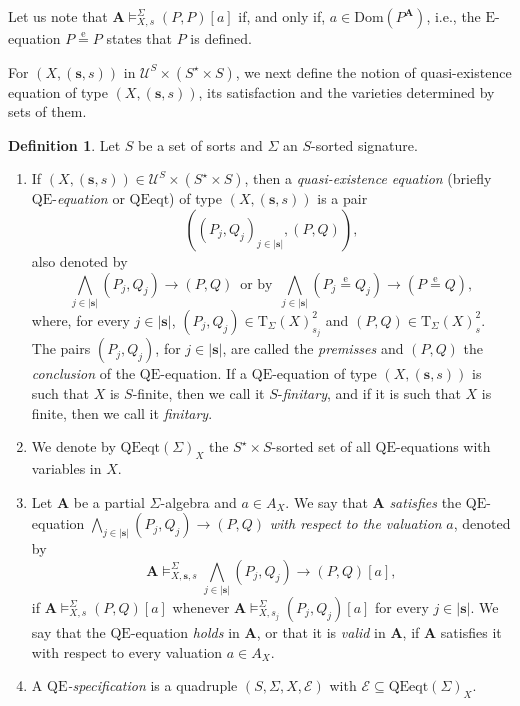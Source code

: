 \documentclass[a4paper, reqno]{amsbook}
\newcommand{\bb}[1]{\ensuremath{\lvert #1 \rvert}}
\newcommand{\eeq}{\overset{\mathrm e}{=}}      %
\newcommand{\QE}{\mathrm{QE}}
\newcommand{\Dom}{\mathrm{Dom}}
\theoremstyle{plain}
\theoremstyle{definition}
\newtheorem{definition}[theorem]{Definition}
\begin{document}
Let us note that $\mathbf{A}\models^{\Sigma}_{X,s}(P,P)[a]$ if, and only if, $a\in\Dom(P^{\mathbf{A}})$, i.e., the $\mathrm{E}$-equation $P\eeq P$ states that $P$ is defined.

For $(X,(\mathbf{s},s))$ in $\boldsymbol{\mathcal{U}}^{S}\times (S^{\star}\times S)$, we next define the notion of quasi-existence equation of type $(X,(\mathbf{s},s))$, its satisfaction and the varieties determined by sets of them.

\begin{definition}\label{DQEEq}
Let $S$ be a set of sorts and $\Sigma$ an $S$-sorted signature.
\begin{enumerate}
\item If $(X,(\mathbf{s},s))\in\boldsymbol{\mathcal{U}}^{S}\times (S^{\star}\times S)$, then a \emph{quasi-existence equation} (briefly $\QE$-\emph{equation} or $\mathrm{QEeqt}$) of type $(X,(\mathbf{s},s))$ is a pair
$$
\left(\left(
P_{j},Q_{j}
\right)_{j\in \bb{\mathbf{s}}},(P,Q)\right),
$$
also denoted by
$$
\textstyle
\bigwedge_{j\in\bb{\mathbf{s}}}(P_{j},Q_{j})\to (P,Q)\, \text{ or by }\,
\bigwedge_{j\in\bb{\mathbf{s}}}(P_{j}\eeq Q_{j})\to (P\eeq Q),
$$
where, for every $j\in \bb{\mathbf{s}}$, $(P_{j},Q_{j})\in\mathrm{T}_{\Sigma}(X)^{2}_{s_{j}}$ and $(P,Q)\in \mathrm{T}_{\Sigma}(X)^{2}_{s}$.
The pairs $(P_{j},Q_{j})$, for $j\in \bb{\mathbf{s}}$, are called the \emph{premisses} and $(P,Q)$ the \emph{conclusion} of the $\QE$-equation.
If a $\QE$-equation of type $(X,(\mathbf{s}, s))$ is such that $X$ is $S$-finite, then we call it $S$-\emph{finitary}, and if it is such that $X$ is finite, then we call it \emph{finitary}.
\item We denote by $\mathrm{QEeqt}(\Sigma)_{X}$ the $S^{\star}\times S$-sorted set of all $\QE$-equations with variables in $X$.
\item Let $\mathbf{A}$ be a partial $\Sigma$-algebra and $a\in A_{X}$.
We say that $\mathbf{A}$ \emph{satisfies} the $\QE$-equation $\bigwedge_{j\in\bb{\mathbf{s}}}(P_{j},Q_{j})\to (P,Q)$ \emph{with respect to the valuation} $a$, denoted by
      $$
      \textstyle
      \mathbf{A}\models^{\Sigma}_{X,\mathbf{s},s}\bigwedge_{j\in\bb{\mathbf{s}}}(P_{j},Q_{j})\to (P,Q) [a],
      $$
      if $\mathbf{A}\models^{\Sigma}_{X,s} (P,Q)[a]$ whenever $\mathbf{A}\models^{\Sigma}_{X,s_{j}} (P_{j},Q_{j})[a]$ for every $j\in \bb{\mathbf{s}}$.
We say that the $\QE$-equation \emph{holds} in $\mathbf{A}$, or that it is \emph{valid} in $\mathbf{A}$, if $\mathbf{A}$ satisfies it with respect to every valuation $a\in A_{X}$.
\item A \emph{$\QE$-specification} is a quadruple $(S,\Sigma,X,\mathcal{E})$ with $\mathcal{E}\subseteq\mathrm{QEeqt}(\Sigma)_{X}$.

\end{enumerate}
\end{definition}
\end{document}
